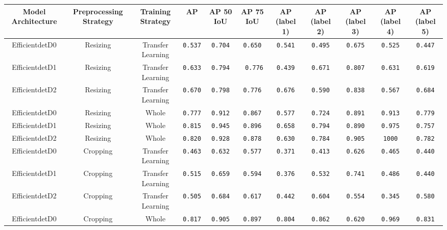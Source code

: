 \documentclass[openright]{normas-utf-tex} %
\begin{document}
\begin{table}[H]
	\centering
	\begin{adjustbox}{width=1\textwidth}
	\label{tab:modelPerformance}
	\begin{tabular}{c|c|c|c|c|c|c|c|c|c|c}
		\hline 
		Model Architecture & Preprocessing Strategy & Training Strategy & AP & AP 50 IoU & AP 75 IoU & AP (label 1) & AP (label 2) & AP (label 3) & AP (label 4) & AP (label 5) \\
		\hline
        Efficientdet\-D0 & Resizing & Transfer Learning & \texttt{0.537} & \texttt{0.704} & \texttt{0.650} & \texttt{0.541} & \texttt{0.495} & \texttt{0.675} & \texttt{0.525} & \texttt{0.447} \\
		Efficientdet\-D1 & Resizing & Transfer Learning & \texttt{0.633} & \texttt{0.794} & \texttt{ 0.776} & \texttt{0.439} & \texttt{0.671} & \texttt{0.807} & \texttt{0.631} & \texttt{0.619} \\
		Efficientdet\-D2 & Resizing & Transfer Learning & \texttt{0.670} & \texttt{0.798} & \texttt{0.776} & \texttt{0.676} & \texttt{0.590} & \texttt{0.838} & \texttt{0.567} & \texttt{0.684} \\
		Efficientdet\-D0 & Resizing & Whole & \texttt{0.777} & \texttt{0.912} & \texttt{0.867} & \texttt{0.577} & \texttt{0.724} & \texttt{0.891} & \texttt{0.913} & \texttt{0.779} \\
		Efficientdet\-D1 & Resizing & Whole & \texttt{0.815} & \texttt{0.945} & \texttt{0.896} & \texttt{0.658} & \texttt{0.794} & \texttt{0.890} & \texttt{0.975} & \texttt{0.757} \\
		Efficientdet\-D2 & Resizing & Whole & \texttt{0.820} & \texttt{0.928} & \texttt{0.878} & \texttt{0.630} & \texttt{0.784} & \texttt{0.905} & \texttt{1000} & \texttt{0.782} \\
		Efficientdet\-D0 & Cropping & Transfer Learning & \texttt{0.463} & \texttt{0.632} & \texttt{0.577} & \texttt{0.371} & \texttt{0.413} & \texttt{0.626} & \texttt{0.465} & \texttt{0.440} \\
		Efficientdet\-D1 & Cropping & Transfer Learning & \texttt{0.515} & \texttt{0.659} & \texttt{0.594} & \texttt{0.376} & \texttt{0.532} & \texttt{0.741} & \texttt{0.486} & \texttt{0.440} \\
		Efficientdet\-D2 & Cropping & Transfer Learning & \texttt{0.505} & \texttt{0.684} & \texttt{0.617} & \texttt{0.442} & \texttt{0.604} & \texttt{0.554} & \texttt{0.345} & \texttt{0.580} \\
		Efficientdet\-D0 & Cropping & Whole & \texttt{0.817} & \texttt{0.905} & \texttt{0.897} & \texttt{0.804} & \texttt{0.862} & \texttt{0.620} & \texttt{0.969} & \texttt{0.831} \\

\end{tabular}
\end{adjustbox}
\end{table}
\end{document}
